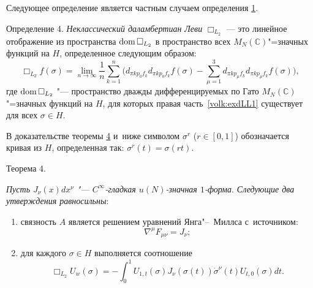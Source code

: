 Следующее определение является частным случаем определения \hyperlink{volk:def1}{1}.

\smallskip

\hypertarget{volk:def4}{}

{\small \sc Определение 4.} {\it
Неклассический даламбертиан Леви} $\Box_{L_{2}}$
--- это линейное отображение из пространства $\mathop{\rm dom} \Box_{L_{2}}$
в пространство всех   $M_N(\mathbb{C})$"=значных функций на $H$, определенное следующим образом:
\begin{equation}
\label{volk:exdLL1}
\Box_{L_{2}}f(\sigma)=\lim_{n\to\infty}\frac 1n\sum_{k=1}^n 
\biggl(d_{\pi kp_0f_k}d_{\pi kp_0f_k}f(\sigma)-\sum_{\mu=1}^3d_{\pi kp_\mu f_k}d_{\pi kp_\mu f_k}f(\sigma)\biggr),
\end{equation}
где $\mathop{\rm dom} \Box_{L_{2}}$ "--- пространство дважды дифференцируемых по Гато $M_N(\mathbb{C})$"=значных функций на $H$, для которых правая часть~\eqref{volk:exdLL1} существует для всех $\sigma\in H$.

\smallskip

В доказательстве теоремы \hyperlink{volk:th4}{4} и~ниже символом $\sigma^r$ ($r\in[0, 1]$) обозначается кривая из $H$, определенная так:
$\sigma^r(t)=\sigma(rt)$.

\smallskip

\hypertarget{volk:th4}{}


{\small \sc Теорема 4}. {\it Пусть $J_\nu(x)dx^\nu$ "--- $C^\infty$-гладкая  $u(N)$-значная $1$-форма$.$
Следующие два утверждения равносильны\/$:$
\begin{enumerate}
\item[\rm 1)]  связность $A$ является решением уравнений Янга"--~Миллса с~источником\/{\rm :}
\begin{equation}
\label{volk:form_350}
 \nabla^\mu F_{\mu\nu}=J_\nu;
\end{equation}
\item[\rm 2)]   для каждого $\sigma\in H$ выполняется соотношение
\begin{equation}
\label{volk:form 360}
 \Box_{L_2} U_{w}(\sigma)=-\int_0^1U_{1,t}(\sigma)J_\nu(\sigma(t))\dot{\sigma}^\nu(t)U_{t, 0}(\sigma)dt.
\end{equation}
\end{enumerate}
}

\smallskip

